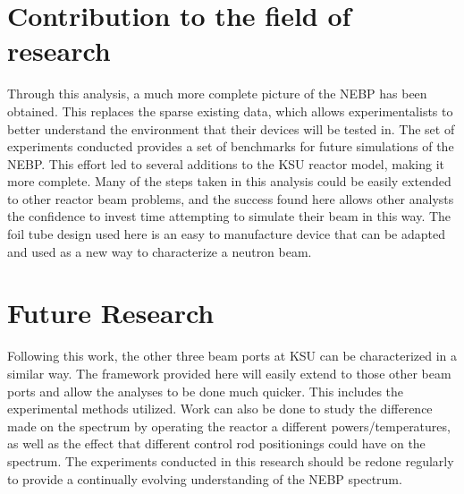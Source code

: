 \section{Contribution to the field of research}
Through this analysis, a much more complete picture of the NEBP has been obtained.
This replaces the sparse existing data, which allows experimentalists to better understand the environment that their devices will be tested in.
The set of experiments conducted provides a set of benchmarks for future simulations of the NEBP.
This effort led to several additions to the KSU reactor model, making it more complete.
Many of the steps taken in this analysis could be easily extended to other reactor beam problems, and the success found here allows other analysts the confidence to invest time attempting to simulate their beam in this way.
The foil tube design used here is an easy to manufacture device that can be adapted and used as a new way to characterize a neutron beam.



\section{Future Research}
Following this work, the other three beam ports at KSU can be characterized in a similar way.
The framework provided here will easily extend to those other beam ports and allow the analyses to be done much quicker.
This includes the experimental methods utilized.
Work can also be done to study the difference made on the spectrum by operating the reactor a different powers/temperatures, as well as the effect that different control rod positionings could have on the spectrum.
The experiments conducted in this research should be redone regularly to provide a continually evolving understanding of the NEBP spectrum.

